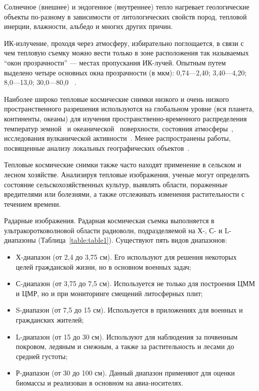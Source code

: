 \documentclass[14pt, russian]{scrartcl}
\begin{document}
Солнечное (внешнее) и эндогенное (внутреннее) тепло нагревает геологические объекты по-разному в зависимости от литологических свойств пород, тепловой инерции, влажности, альбедо и многих других причин.

ИК-излучение, проходя через атмосферу, избирательно поглощается, в связи с чем тепловую съемку можно вести только в зоне расположения так называемых “окон прозрачности” — местах пропускания ИК-лучей. Опытным путем выделено четыре основных окна прозрачности (в мкм): 0,74—2,40; 3,40—4,20; 8,0—13,0; 30,0—80,0 ~\cite{6}.

Наиболее широко тепловые космические снимки низкого и очень низкого пространственного разрешения используются на глобальном уровне (вся планета, континенты, океаны) для изучения пространственно-временного распределения температур земной~\cite{7} и океанической~\cite{8, 9, 10} поверхности, состояния атмосферы~\cite{11, 12}, исследования вулканической активности~\cite{13}. Менее распространены работы, посвященные анализу локальных географических объектов~\cite{14}.

Тепловые космические снимки также часто находят применение в сельском и лесном хозяйстве. Анализируя тепловые изображения, ученые могут определять состояние сельскохозяйственных культур, выявлять области, пораженные вредителями или болезнями, а также отслеживать изменения растительности с течением времени.

Радарные изображения. Радарная космическая съемка выполняется в ультракоротковолновой области радиоволн, подразделяемой на Х-, С- и L- диапазоны (Таблица~\ref{table:table1}). Существуют пять видов диапазонов:

\begin{itemize}
    \item Х-диапазон (от 2,4 до 3,75 см). Его используют для решения некоторых целей гражданской жизни, но в основном военных задач;
    \item С-диапазон (от 3,75 до 7,5 см). Используется не только для построения ЦММ и ЦМР, но и при мониторинге смещений литосферных плит;
    \item S-диапазон (от 7,5 до 15 см). Используется в приложениях для военных и гражданских жителей;
    \item L-диапазон (от 15 до 30 см). Используют для наблюдения за почвенным покровом, ледяным и снежным, а также за растительность и лесами до средней густоты;
    \item Р-диапазон (от 30 до 100 см). Данный диапазон применяют для оценки биомассы и реализован в основном на авиа-носителях.
\end{itemize}
\end{document}
